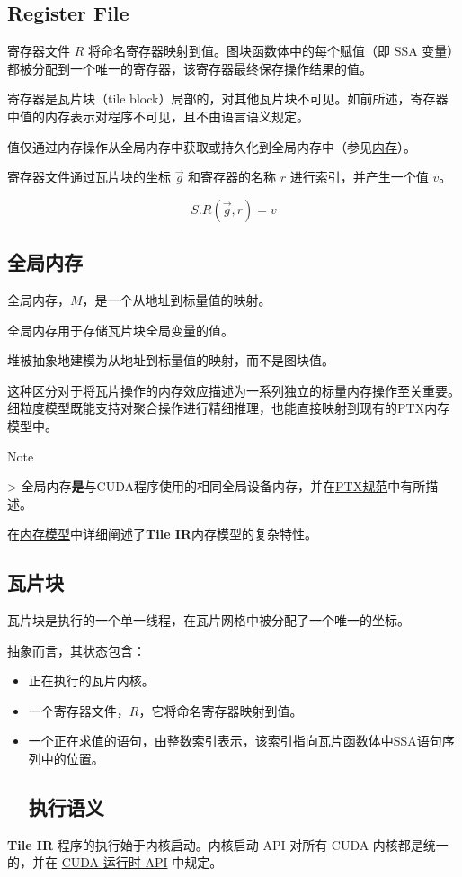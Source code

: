 \documentclass{article}
\begin{document}
\subsection{Register File}

寄存器文件 $R$ 将命名寄存器映射到值。图块函数体中的每个赋值（即 SSA 变量）都被分配到一个唯一的寄存器，该寄存器最终保存操作结果的值。

寄存器是瓦片块（tile block）局部的，对其他瓦片块不可见。如前所述，寄存器中值的内存表示对程序不可见，且不由语言语义规定。


值仅通过内存操作从全局内存中获取或持久化到全局内存中（参见\href{https://docs.nvidia.com/cuda/tile-ir/latest/sections/operations.html#op-group-memory}{内存}）。


寄存器文件通过瓦片块的坐标 $\vec{g}$ 和寄存器的名称 $r$ 进行索引，并产生一个值 $v$。

$$S.R(\vec{g},r)=v$$

\subsection{全局内存}

全局内存，$M$，是一个从地址到标量值的映射。


全局内存用于存储瓦片块全局变量的值。


堆被抽象地建模为从地址到标量值的映射，而不是图块值。

这种区分对于将瓦片操作的内存效应描述为一系列独立的标量内存操作至关重要。细粒度模型既能支持对聚合操作进行精细推理，也能直接映射到现有的PTX内存模型中。


Note

> 全局内存\textbf{是}与CUDA程序使用的相同全局设备内存，并在\href{https://docs.nvidia.com/cuda/parallel-thread-execution/#state-spaces}{PTX规范}中有所描述。


在\href{https://docs.nvidia.com/cuda/tile-ir/latest/sections/memory_model.html#section-memory-model}{内存模型}中详细阐述了\textbf{Tile IR}内存模型的复杂特性。



\subsection{瓦片块}

瓦片块是执行的一个单一线程，在瓦片网格中被分配了一个唯一的坐标。


抽象而言，其状态包含：

\begin{itemize}
\item 正在执行的瓦片内核。
\item 一个寄存器文件，$R$，它将命名寄存器映射到值。
\item 一个正在求值的语句，由整数索引表示，该索引指向瓦片函数体中SSA语句序列中的位置。


\subsection{执行语义}

\end{itemize}
\textbf{Tile IR} 程序的执行始于内核启动。内核启动 API 对所有 CUDA 内核都是统一的，并在 \href{https://docs.nvidia.com/cuda/cuda-runtime-api/index.html}{CUDA 运行时 API} 中规定。
\end{document}
